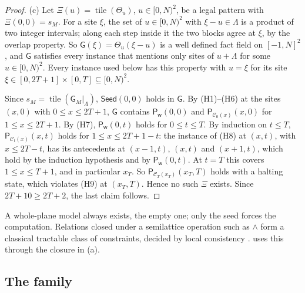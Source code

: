 \begin{proof}
(c) Let $\Xi(u)=\operatorname{tile}(\Theta_u)$, $u\in[0,N)^2$, be a legal pattern with $\Xi(0,0)=s_M$. For a site $\xi$, the set of $u\in[0,N)^2$ with $\xi-u\in\Lambda$ is a product of two integer intervals; along each step inside it the two blocks agree at $\xi$, by the overlap property. So $\mathsf G(\xi)=\Theta_u(\xi-u)$ is a well defined fact field on $[-1,N]^2$, and $\mathsf G$ satisfies every instance that mentions only sites of $u+\Lambda$ for some $u\in[0,N)^2$. Every instance used below has this property with $u=\xi$ for its site $\xi\in[0,2T+1]\times[0,T]\subseteq[0,N)^2$.

Since $s_M=\operatorname{tile}(\mathsf G_M|_\Lambda)$, $\mathsf{Seed}(0,0)$ holds in $\mathsf G$. By (H1)--(H6) at the sites $(x,0)$ with $0\le x\le2T+1$, $\mathsf G$ contains $\mathsf P_{\mathsf w}(0,0)$ and $\mathsf P_{\mathcal C_0(x)}(x,0)$ for $1\le x\le2T+1$. By (H7), $\mathsf P_{\mathsf w}(0,t)$ holds for $0\le t\le T$. By induction on $t\le T$, $\mathsf P_{\mathcal C_t(x)}(x,t)$ holds for $1\le x\le2T+1-t$: the instance of (H8) at $(x,t)$, with $x\le2T-t$, has its antecedents at $(x-1,t)$, $(x,t)$ and $(x+1,t)$, which hold by the induction hypothesis and by $\mathsf P_{\mathsf w}(0,t)$. At $t=T$ this covers $1\le x\le T+1$, and in particular $x_T$. So $\mathsf P_{\mathcal C_T(x_T)}(x_T,T)$ holds with a halting state, which violates (H9) at $(x_T,T)$. Hence no such $\Xi$ exists. Since $2T+10\ge2T+2$, the last claim follows.
\end{proof}

A whole-plane model always exists, the empty one; only the seed forces the computation. Relations closed under a semilattice operation such as $\wedge$ form a classical tractable class of constraints, decided by local consistency \cite{JCG97,FederVardi98,BartoKozik14}.  uses this through the closure in (a).

\subsection{The family}\label{fam:sub-family}

